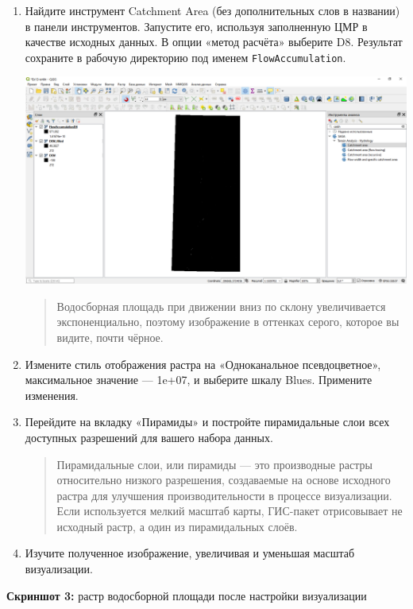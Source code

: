 \documentclass[
  12pt,
]{book}
\begin{document}
\begin{enumerate}
\def\labelenumi{\arabic{enumi}.}
\item
  Найдите инструмент Catchment Area (без дополнительных слов в названии) в панели инструментов. Запустите его, используя заполненную ЦМР в качестве исходных данных. В опции «метод расчёта» выберите D8. Результат сохраните в рабочую директорию под именем \texttt{FlowAccumulation}.

  \includegraphics{images/Ex13/FlowAcc.png}

  \begin{quote}
  Водосборная площадь при движении вниз по склону увеличивается экспоненциально, поэтому изображение в оттенках серого, которое вы видите, почти чёрное.
  \end{quote}
\item
  Измените стиль отображения растра на «Одноканальное псевдоцветное», максимальное значение --- 1e+07, и выберите шкалу Blues. Примените изменения.
\item
  Перейдите на вкладку «Пирамиды» и постройте пирамидальные слои всех доступных разрешений для вашего набора данных.

  \begin{quote}
  Пирамидальные слои, или пирамиды --- это производные растры относительно низкого разрешения, создаваемые на основе исходного растра для улучшения производительности в процессе визуализации. Если используется мелкий масштаб карты, ГИС-пакет отрисовывает не исходный растр, а один из пирамидальных слоёв.
  \end{quote}
\item
  Изучите полученное изображение, увеличивая и уменьшая масштаб визуализации.
\end{enumerate}

\textbf{Скриншот 3:} растр водосборной площади после настройки визуализации
\end{document}
